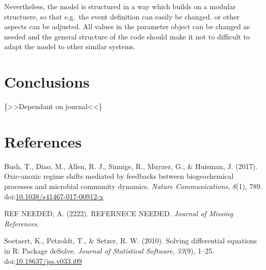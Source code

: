\documentclass[
]{article}
\newlength{\cslhangindent}
\newlength{\cslentryspacingunit} %
\newenvironment{CSLReferences}[2] %
 {%
  \setlength{\parindent}{0pt}
  \ifodd #1
  \let\oldpar\par
  \def\par{\hangindent=\cslhangindent\oldpar}
  \fi
  \setlength{\parskip}{#2\cslentryspacingunit}
 }%
 {}
\begin{document}
Nevertheless, the model is structured in a way which builds on a modular structuere, so that e.g.~the event definition can easily be changed. or other aspects can be adjusted. All values in the parameter object can be changed as needed and the general structure of the code should make it not to difficult to adapt the model to other similar systems.

\hypertarget{conclusions}{%
\section{Conclusions}\label{conclusions}}

\{\textgreater\textgreater Dependant on journal\textless\textless\}

\hypertarget{references}{%
\section*{References}\label{references}}

\hypertarget{refs}{}
\begin{CSLReferences}{1}{0}
\leavevmode{}%
Bush, T., Diao, M., Allen, R. J., Sinnige, R., Muyzer, G., \& Huisman, J. (2017). Oxic-anoxic regime shifts mediated by feedbacks between biogeochemical processes and microbial community dynamics. \emph{Nature Communications}, \emph{8}(1), 789. doi:\href{https://doi.org/10.1038/s41467-017-00912-x}{10.1038/s41467-017-00912-x}

\leavevmode{}%
REF NEEDED, A. (2222). {REFERNECE NEEDED}. \emph{Journal of Missing References}.

\leavevmode{}%
Soetaert, K., Petzoldt, T., \& Setzer, R. W. (2010). Solving differential equations in {R}: {Package deSolve}. \emph{Journal of Statistical Software}, \emph{33}(9), 1--25. doi:\href{https://doi.org/10.18637/jss.v033.i09}{10.18637/jss.v033.i09}

\end{CSLReferences}
\end{document}
